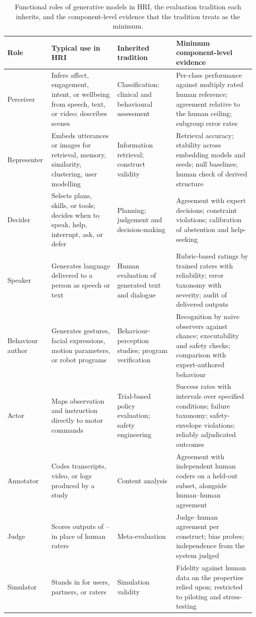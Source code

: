 \begin{table}[t]
\caption{Functional roles of generative models in HRI, the evaluation
tradition each inherits, and the component-level evidence that the tradition
treats as the minimum.}
\label{tab:roles}
\small
\begin{tabularx}{\textwidth}{@{}L{2.25cm}L{3.6cm}L{2.9cm}Y@{}}
\toprule
Role & Typical use in HRI & Inherited tradition & Minimum component-level evidence \\
\midrule
{} Perceiver & Infers affect, engagement, intent, or wellbeing from
speech, text, or video; describes scenes & Classification; clinical and
behavioural assessment & Per-class performance against multiply rated human
reference; agreement relative to the human ceiling; subgroup error rates \\
 Representer & Embeds utterances or images for retrieval, memory,
similarity, clustering, user modelling & Information retrieval; construct
validity & Retrieval accuracy; stability across embedding models and seeds;
null baselines; human check of derived structure \\
 Decider & Selects plans, skills, or tools; decides when to speak,
help, interrupt, ask, or defer & Planning; judgement and decision-making &
Agreement with expert decisions; constraint violations; calibration of
abstention and help-seeking \\
 Speaker & Generates language delivered to a person as speech or text
& Human evaluation of generated text and dialogue & Rubric-based ratings by
trained raters with reliability; error taxonomy with severity; audit of
delivered outputs \\
 Behaviour author & Generates gestures, facial expressions, motion
parameters, or robot programs & Behaviour-perception studies; program
verification & Recognition by naive observers against chance; executability
and safety checks; comparison with expert-authored behaviour \\
 Actor & Maps observation and instruction directly to motor commands &
Trial-based policy evaluation; safety engineering & Success rates with
intervals over specified conditions; failure taxonomy; safety-envelope
violations; reliably adjudicated outcomes \\
\midrule
{} Annotator & Codes transcripts, video, or logs produced by a study &
Content analysis & Agreement with independent human coders on a held-out
subset, alongside human--human agreement \\
 Judge & Scores outputs of -- in place of human raters
& Meta-evaluation & Judge--human agreement per construct; bias probes;
independence from the system judged \\
 Simulator & Stands in for users, partners, or raters & Simulation
validity & Fidelity against human data on the properties relied upon;
restricted to piloting and stress-testing \\
\bottomrule
\end{tabularx}
\end{table}

